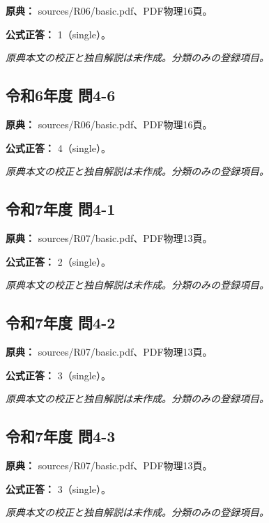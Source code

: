 \noindent\textbf{原典：} sources/R06/basic.pdf、PDF物理16頁。

\textbf{公式正答：} 1（single）。

\par\textit{原典本文の校正と独自解説は未作成。分類のみの登録項目。}

\subsection{令和6年度 問4-6}
\label{q:r06-reg-basic-4-6}

\noindent\textbf{原典：} sources/R06/basic.pdf、PDF物理16頁。

\textbf{公式正答：} 4（single）。

\par\textit{原典本文の校正と独自解説は未作成。分類のみの登録項目。}

\subsection{令和7年度 問4-1}
\label{q:r07-reg-basic-4-1}

\noindent\textbf{原典：} sources/R07/basic.pdf、PDF物理13頁。

\textbf{公式正答：} 2（single）。

\par\textit{原典本文の校正と独自解説は未作成。分類のみの登録項目。}

\subsection{令和7年度 問4-2}
\label{q:r07-reg-basic-4-2}

\noindent\textbf{原典：} sources/R07/basic.pdf、PDF物理13頁。

\textbf{公式正答：} 3（single）。

\par\textit{原典本文の校正と独自解説は未作成。分類のみの登録項目。}

\subsection{令和7年度 問4-3}
\label{q:r07-reg-basic-4-3}

\noindent\textbf{原典：} sources/R07/basic.pdf、PDF物理13頁。

\textbf{公式正答：} 3（single）。

\par\textit{原典本文の校正と独自解説は未作成。分類のみの登録項目。}

